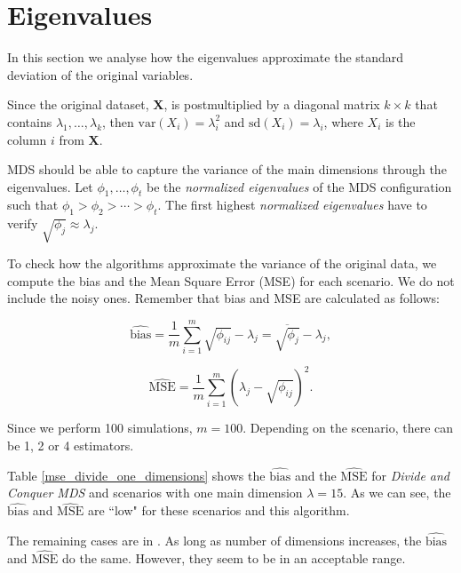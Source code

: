 \documentclass[11pt]{report}
\begin{document}
\FloatBarrier


\section{Eigenvalues}
In this section we analyse how the eigenvalues approximate the standard 
deviation of the original variables. 

\indent Since the original dataset, \textbf{X}, is postmultiplied by a diagonal 
matrix $k \times k$ that contains $\lambda_1, \dots, \lambda_k$, then 
$\mbox{var}(X_i) = \lambda_i^2$ and $\mbox{sd}(X_i) = \lambda_i$, where
$X_i$ is the column $i$ from \textbf{X}.

\indent MDS should be able to capture the variance of the main dimensions 
through the eigenvalues. Let $\phi_1, \dots, \phi_t$ be the 
\textit{normalized eigenvalues} of the MDS configuration such that 
$\phi_1 > \phi_2 > \cdots > \phi_t$. The first highest
\textit{normalized eigenvalues} have to verify $\sqrt{\phi_j} \approx \lambda_j$.


\indent To check how the algorithms approximate the variance of the original 
data, we compute the bias and the Mean Square Error (MSE) for each scenario. 
We do not include the noisy ones. Remember that bias and MSE are calculated as 
follows:

$$
\widehat{\mbox{bias}} = \frac{1}{m}\sum_{i=1}^m \sqrt{\phi_{ij}} - \lambda_j = \overline{\sqrt{\phi_j}} - \lambda_j,
$$

$$
\widehat{\mbox{MSE}} = \frac{1}{m} \sum_{i = 1} ^m (\lambda_j - \sqrt{\phi_{ij}})^2.
$$


\indent Since we perform 100 simulations, $m = 100$. Depending on the 
scenario, there can be 1, 2 or 4 estimators. 

\indent Table \ref{mse_divide_one_dimensions} shows the $\widehat{\mbox{bias}}$
and the $\widehat{\mbox{MSE}}$ for \textit{Divide and Conquer MDS} and scenarios 
with one main dimension $\lambda = 15$. As we can see, the 
$\widehat{\mbox{bias}}$ and $\widehat{\mbox{MSE}}$ are ``low" for these 
scenarios and this algorithm.

\indent The remaining cases are in . As long as number of 
dimensions increases, the $\widehat{\mbox{bias}}$ and $\widehat{\mbox{MSE}}$ 
do the same. However, they seem to be in an acceptable range.
\end{document}
